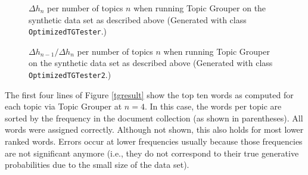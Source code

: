 \documentclass[10pt, a4paper, oneside]{article}
\begin{document}
\begin{figure}
\caption{$\Delta h_n$ per number of topics $n$ when running Topic Grouper on the synthetic data set as described above (Generated with class \texttt{OptimizedTGTester}.)}
\label{impresult}
\end{figure}

\begin{figure}
\caption{$\Delta h_{n-1} / \Delta h_{n}$ per number of topics $n$ when running Topic Grouper on the synthetic data set as described above (Generated with class \texttt{OptimizedTGTester2}.)}
\label{impresult2}
\end{figure}

The first four lines of Figure \ref{tgresult} show the top ten words as computed for each topic via Topic Grouper at $n = 4$. In this case, the words per topic are sorted by the frequency in the document collection (as shown in parentheses). All words were assigned correctly. Although not shown, this also holds for most lower ranked words. Errors occur at lower frequencies usually because those frequencies are not significant anymore (i.e., they do not correspond to their true generative probabilities due to the small size of the data set).
\end{document}
